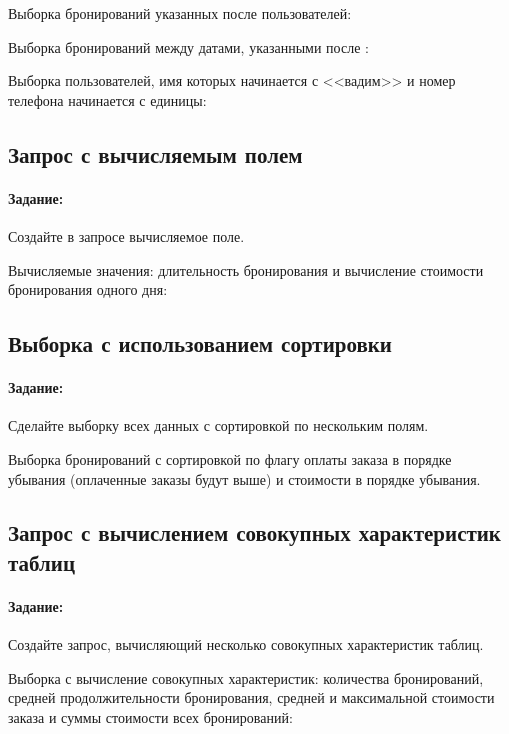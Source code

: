 Выборка бронирований указанных после  пользователей:

Выборка бронирований между датами, указанными после :

Выборка пользователей, имя которых начинается с <<вадим>> и номер телефона начинается с единицы:

\subsection{Запрос с вычисляемым полем}

\paragraph{Задание:} Создайте в запросе вычисляемое поле. 

Вычисляемые значения: длительность бронирования и вычисление стоимости бронирования одного дня: 

\newpage

\subsection{Выборка с использованием сортировки}

\paragraph{Задание:} Сделайте выборку всех данных с сортировкой по нескольким полям.

Выборка бронирований с сортировкой по флагу оплаты заказа в порядке убывания (оплаченные заказы будут выше) и стоимости в порядке убывания. 

\subsection{Запрос с вычислением совокупных характеристик таблиц}

\paragraph{Задание:} Создайте запрос, вычисляющий несколько совокупных характеристик таблиц.

Выборка с вычисление совокупных характеристик: количества бронирований, средней продолжительности бронирования, средней и максимальной стоимости заказа и суммы стоимости всех бронирований:

